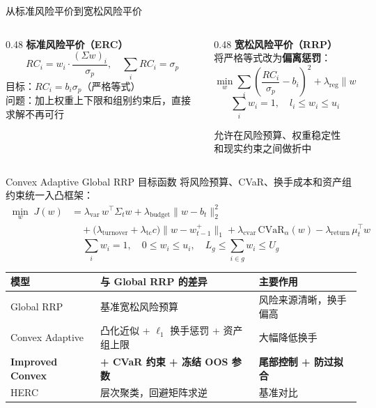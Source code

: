\documentclass[aspectratio=169,11pt]{beamer}
\begin{document}
\begin{frame}{从标准风险平价到宽松风险平价}
  \begin{columns}[T]
    \begin{column}{0.48\textwidth}
      \textbf{标准风险平价（ERC）}
      \[
        RC_i = w_i \cdot \frac{(\Sigma w)_i}{\sigma_p},\quad
        \sum_i RC_i = \sigma_p
      \]
      目标：$RC_i = b_i \sigma_p$（严格等式）\\[0.5em]
      \alert{问题}：加上权重上下限和组别约束后，直接求解不再可行
    \end{column}
    \begin{column}{0.48\textwidth}
      \textbf{宽松风险平价（RRP）}\\[0.3em]
      将严格等式改为\textbf{偏离惩罚}：
      \[
        \min_w \sum_i \!\left(\frac{RC_i}{\sigma_p} - b_i\right)^{\!2}
        + \lambda_{\mathrm{reg}}\|w - w_0\|_2^2
      \]
      \[
        \textstyle\sum_i w_i = 1,\quad l_i \le w_i \le u_i
      \]
      \begin{block}{}
        允许在风险预算、权重稳定性\\
        和现实约束之间做折中
      \end{block}
    \end{column}
  \end{columns}
\end{frame}

\begin{frame}{Convex Adaptive Global RRP 目标函数}
  \small
  将风险预算、CVaR、换手成本和资产组约束统一入凸框架：
  \begin{align*}
    \min_w\; J(w) &= \lambda_{\mathrm{var}}\, w^\top\Sigma_t w
    + \lambda_{\mathrm{budget}}\|w - b_t\|_2^2 \\
    &\quad+ \bigl(\lambda_{\mathrm{turnover}} + \lambda_{\mathrm{tc}} c\bigr)\|w - w_{t-1}^+\|_1
    + \lambda_{\mathrm{cvar}}\,\mathrm{CVaR}_\alpha(w)
    - \lambda_{\mathrm{return}}\,\mu_t^\top w
  \end{align*}
  \[
    \textstyle\sum_i w_i = 1,\quad 0 \le w_i \le u_i,\quad L_g \le \textstyle\sum_{i\in g} w_i \le U_g
  \]
  \begin{center}
    \footnotesize
    \renewcommand{\arraystretch}{1.25}
    \begin{tabular}{l>{\raggedright\arraybackslash}p{4.8cm}>{\raggedright\arraybackslash}p{3.5cm}}
      \toprule
      模型 & 与 Global RRP 的差异 & 主要作用 \\
      \midrule
      Global RRP & 基准宽松风险预算 & 风险来源清晰，换手偏高 \\
      Convex Adaptive & 凸化近似 + $\ell_1$ 换手惩罚 + 资产组上限 & 大幅降低换手 \\
      \textbf{Improved Convex} & \textbf{+ CVaR 约束 + 冻结 OOS 参数} & \textbf{尾部控制 + 防过拟合} \\
      HERC & 层次聚类，回避矩阵求逆 & 基准对比 \\
      \bottomrule
    \end{tabular}
  \end{center}
\end{frame}
\end{document}
